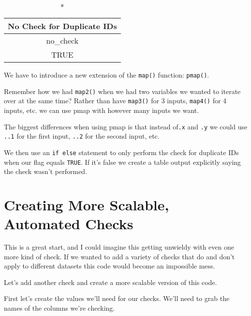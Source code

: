 \documentclass[
  letterpaper,
  DIV=11,
  numbers=noendperiod]{scrreprt}
\begin{document}
\begin{longtable}{c}
\caption*{
{\large No Check for Duplicate IDs}
} \\ 
\toprule
no\_check \\ 
\midrule
TRUE \\ 
\bottomrule
\end{longtable}

We have to introduce a new extension of the \texttt{map()} function:
\texttt{pmap()}.

Remember how we had \texttt{map2()} when we had two variables we wanted
to iterate over at the same time? Rather than have \texttt{map3()} for 3
inputs, \texttt{map4()} for 4 inputs, etc. we can use pmap with however
many inputs we want.

The biggest differences when using pmap is that instead of\texttt{.x}
and \texttt{.y} we could use \texttt{..1} for the first input,
\texttt{..2} for the second input, etc.

We then use an \texttt{if\ else} statement to only perform the check for
duplicate IDs when our flag equals \texttt{TRUE}. If it's false we
create a table output explicitly saying the check wasn't performed.

\hypertarget{creating-more-scalable-automated-checks}{%
\section{Creating More Scalable, Automated
Checks}\label{creating-more-scalable-automated-checks}}

This is a great start, and I could imagine this getting unwieldy with
even one more kind of check. If we wanted to add a variety of checks
that do and don't apply to different datasets this code would become an
impossible mess.

Let's add another check and create a more scalable version of this code.

First let's create the values we'll need for our checks. We'll need to
grab the names of the columns we're checking.
\end{document}
